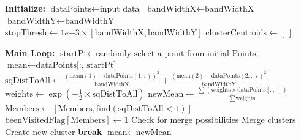\begin{algorithm}[H]
\caption{Mean-shift Clustering}
\label{alg:mean_shift}
\begin{algorithmic}[1]
    \vspace{2em}
    \State \textbf{Initialize:}
    \vspace{0.3em}
    \Statex $\text{dataPoints} \gets \text{input data}$
    \Statex $\text{bandWidthX} \gets \text{bandWidthX}$
    \Statex $\text{bandWidthY} \gets \text{bandWidthY}$
    \Statex $\text{stopThresh} \gets 1e{-3} \times [\text{bandWidthX}, \text{bandWidthY}]$
    \Statex $\text{clusterCentroids} \gets [\,]$
    \vspace{1em}
    
    \State \textbf{Main Loop:}
    \vspace{1em}
        \State $\text{startPt} \gets \text{randomly select a point from initial Points}$
        \State $\text{mean} \gets \text{dataPoints[:, startPt]}$
        \vspace{0.5em}
            \State $\text{sqDistToAll} \gets \frac{(\text{mean}(1)-\text{dataPoints}(1,:))^2}{\text{bandWidthX}} + \frac{(\text{mean}(2)-\text{dataPoints}(2,:))^2}{\text{bandWidthY}}$
            \vspace{0.5em}
            \State $\text{weights} \gets \exp\left(-\frac{1}{2} \times \text{sqDistToAll}\right)$
            \vspace{0.5em}
            \State $\text{newMean} \gets \frac{\sum (\text{weights} \times \text{dataPoints}[:, :])}{\sum \text{weights}}$
            \vspace{0.5em}
            \State $\text{Members} \gets [\text{Members}, \text{find}(\text{sqDistToAll} < 1)]$
            \vspace{0.5em}
            \State $\text{beenVisitedFlag}[\text{Members}] \gets 1$
            \vspace{0.5em}
                \State Check for merge possibilities
                \vspace{0.5em}
                    \State Merge clusters
                \Else
                    \State Create new cluster
                \EndIf
                \State \textbf{break}
            \EndIf
            \vspace{0.5em}
            \State $\text{mean} \gets \text{newMean}$
        \EndWhile
        \vspace{0.5em}
        \State {}
    \EndWhile
    \vspace{1em}
\end{algorithmic}
\end{algorithm}

